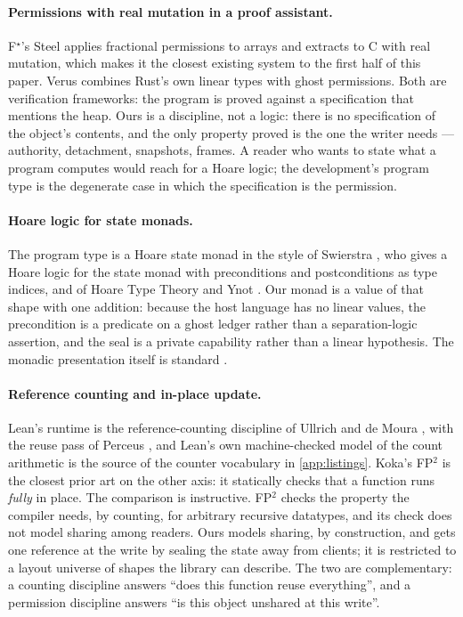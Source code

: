 \documentclass[11pt,a4paper]{article}
\theoremstyle{definition}
\theoremstyle{plain}
\begin{document}
\paragraph{Permissions with real mutation in a proof assistant.}
F$^{\star}$'s Steel \cite{fromherz2021steel} applies fractional permissions to arrays
and extracts to C with real mutation, which makes it the closest existing system
to the first half of this paper. Verus \cite{lattuada2023verus} combines Rust's
own linear types with ghost permissions. Both are verification frameworks: the
program is proved against a specification that mentions the heap. Ours is a
discipline, not a logic: there is no specification of the object's contents, and
the only property proved is the one the writer needs --- authority, detachment,
snapshots, frames. A reader who wants to state what a program computes would
reach for a Hoare logic; the development's program type is the degenerate case
in which the specification is the permission.

\paragraph{Hoare logic for state monads.}
The program type is a Hoare state monad in the style of Swierstra
\cite{swierstra2009hoare}, who gives a Hoare logic for the state monad with
preconditions and postconditions as type indices, and of Hoare Type Theory and
Ynot \cite{nanevski2008htt,nanevski2008ynot}. Our monad is a value of that shape
with one addition: because the host language has no linear values, the
precondition is a predicate on a ghost ledger rather than a separation-logic
assertion, and the seal is a private capability rather than a linear hypothesis.
The monadic presentation itself is standard \cite{wadler1992monads}.

\paragraph{Reference counting and in-place update.}
Lean's runtime is the reference-counting discipline of Ullrich and de Moura
\cite{ullrich2019counting}, with the reuse pass of Perceus
\cite{reinking2021perceus}, and Lean's own machine-checked model of the count
arithmetic is the source of the counter vocabulary in \cref{app:listings}. Koka's
FP${}^2$ \cite{lorenzen2023fp2} is the closest prior art on the other axis: it
statically checks that a function runs \emph{fully} in place. The comparison is
instructive. FP${}^2$ checks the property the compiler needs, by counting, for
arbitrary recursive datatypes, and its check does not model sharing among
readers. Ours models sharing, by construction, and gets one reference at the
write by sealing the state away from clients; it is restricted to a layout
universe of shapes the library can describe. The two are complementary: a
counting discipline answers ``does this function reuse everything'', and a
permission discipline answers ``is this object unshared at this write''.
\end{document}
